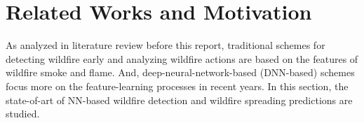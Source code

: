 \section{Related Works and Motivation}
As analyzed in literature review before this report, traditional schemes for detecting wildfire early and analyzing wildfire actions are based on the features of wildfire smoke and flame. And, deep-neural-network-based (DNN-based) schemes focus more on the feature-learning processes in recent years. In this section, the state-of-art of NN-based wildfire detection and wildfire spreading predictions are studied.
\par
